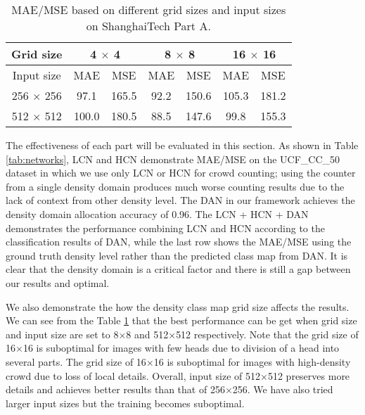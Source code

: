 \documentclass[journal]{IEEEtran}
\begin{document}
\begin{table}[t]
\begin{center}
\caption{MAE/MSE based on different grid sizes and input sizes on ShanghaiTech Part A.}
\label{tab:gridsize}
\begin{tabular}{c|cc|cc|cc}
\hline
Grid size &\multicolumn{2}{|c|}{4 $\times$ 4}&\multicolumn{2}{|c|}{8 $\times$ 8}&\multicolumn{2}{|c}{16 $\times$ 16}\\
\hline\hline
Input size &MAE&MSE&MAE&MSE&MAE&MSE\\
  \hline
    256 $\times$ 256  &	97.1 & 165.5   &  92.2 & 150.6&105.3 & 181.2   \\
  \hline
  512 $\times$ 512   &	100.0 & 180.5 &  88.5 & 147.6&99.8 & 155.3   \\
  \hline
 \end{tabular}
\end{center}
\vspace{-0.15in}
\end{table}

The effectiveness of each part will be evaluated in this section.
As shown in Table \ref{tab:networks}, LCN and HCN demonstrate MAE/MSE on the UCF\_CC\_50 dataset in which we use only LCN or HCN for crowd counting; using the counter from a single density domain produces much worse counting results due to the lack of context from other density level.
The DAN in our framework achieves the density domain allocation accuracy of 0.96.
The LCN + HCN + DAN demonstrates the performance combining LCN and HCN according to the classification results of DAN, while the last row shows the MAE/MSE using the ground truth density level rather than the predicted class map from DAN. It is clear that the density domain is a critical factor and there is still a gap between our results and optimal.

We also demonstrate the how the density class map grid size affects the results. We can see from the Table \ref{tab:gridsize} that the best performance can be get when  grid size and input size are set to 8$\times$8 and 512$\times$512 respectively.
Note that the grid size of 16$\times$16 is suboptimal for images with few heads due to division of a head into several parts. The grid size of 16$\times$16 is suboptimal for images with high-density crowd due to loss of local details. Overall, input size of 512$\times$512 preserves more details and achieves better results than that of 256$\times$256. We have also tried larger input sizes but the training becomes suboptimal.
\end{document}
